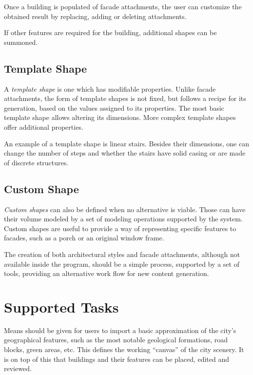 Once a building is populated of facade attachments,
the user can customize the obtained result
by replacing, adding or deleting attachments.

If other features are required for the building,
additional shapes can be summoned.


\subsection{Template Shape}

A \emph{template shape} is one which has modifiable properties.
Unlike facade attachments, the form of template shapes
is not fixed, but follows a recipe for its generation,
based on the values assigned to its properties.
The most basic template shape allows altering its dimensions.
More complex template shapes offer additional properties.

An example of a template shape is linear stairs.
Besides their dimensions, one can change the number of steps and
whether the stairs have solid casing or are made of discrete structures.




\subsection{Custom Shape}

\emph{Custom shapes} can also be defined when no alternative is viable.
Those can have their volume modeled by a set of modeling operations
supported by the system.
Custom shapes are useful to provide a way of representing
specific features to facades, such as a porch or an original window frame.

The creation of both architectural styles and facade attachments,
although not available inside the program, should be a simple process,
supported by a set of tools, providing an alternative work flow for new
content generation.



\section{Supported Tasks}

Means should be given for users to import a basic approximation of the
city's geographical features, such as the most notable geological formations,
road blocks, green areas, etc.
This defines the working ``canvas'' of the city scenery.
It is on top of this that buildings and their features can be placed, edited and reviewed.



